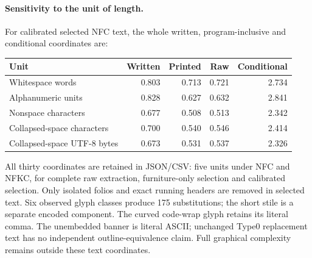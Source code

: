 \documentclass[11pt,a4paper]{article}
\begin{document}
\paragraph{Sensitivity to the unit of length.}
For calibrated selected NFC text, the whole written, program-inclusive
and conditional coordinates are:
\begin{center}\small\begin{tabular}{lrrrr}\toprule
Unit&Written&Printed&Raw&Conditional\\\midrule
Whitespace words & 0.803 & 0.713 & 0.721 & 2.734 \\
Alphanumeric units & 0.828 & 0.627 & 0.632 & 2.841 \\
Nonspace characters & 0.677 & 0.508 & 0.513 & 2.342 \\
Collapsed-space characters & 0.700 & 0.540 & 0.546 & 2.414 \\
Collapsed-space UTF-8 bytes & 0.673 & 0.531 & 0.537 & 2.326 \\
\bottomrule\end{tabular}\end{center}
All thirty coordinates are retained in JSON/CSV: five units under NFC and
NFKC, for complete raw extraction, furniture-only selection and calibrated
selection. Only isolated folios and exact running headers are removed in
selected text. Six observed glyph classes produce 175 substitutions; the
short stile is a separate encoded component. The curved code-wrap glyph
retains its literal comma. The unembedded banner is literal ASCII; unchanged
Type0 replacement text has no independent outline-equivalence claim.
Full graphical complexity remains outside these text coordinates.
\end{document}
